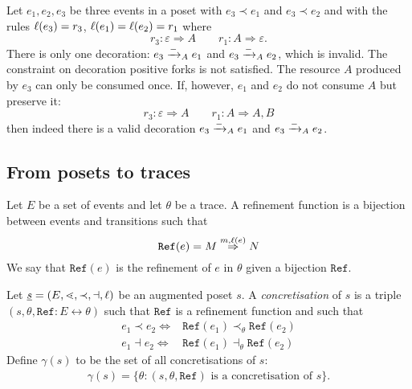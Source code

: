 \begin{example}
  Let $e_1,e_2,e_3$ be three events in a poset with $e_3\prec e_1$ and $e_3\prec e_2$ and with the rules $\ell(e_3)=r_3$, $\ell(e_1)=\ell(e_2)=r_1$ where
  \[
  r_3: \varepsilon \Rightarrow A\qquad r_1: A\Rightarrow \varepsilon.
  \]
  There is only one decoration: $e_3\mathrel{\xrightarrow{-}}_{A} e_1$ and $e_3\mathrel{\xrightarrow{-}}_{A} e_2$, which is invalid. The constraint on decoration positive forks is not satisfied. The resource $A$ produced by $e_3$ can only be consumed once.
  If, however, $e_1$ and $e_2$ do not consume $A$ but preserve it:
  \[
  r_3: \varepsilon \Rightarrow A\qquad r_1: A\Rightarrow A,B
  \]
  then indeed there is a valid decoration $e_3\mathrel{\xrightarrow{-}}_{A} e_1$ and $e_3\mathrel{\xrightarrow{-}}_{A} e_2$.
\end{example}

\subsection{From posets to traces}
\label{sec:refinement}

\begin{definition}
  Let $E$ be a set of events and let $\theta$ be a trace. A refinement function is a bijection between events and transitions such that
  \[
  \mathtt{Ref}(e) = M\overset{m,\ell(e)}{\Rightarrow}N
  \]
  We say that $\mathtt{Ref}(e)$ is the refinement of $e$ in $\theta$ given a bijection $\mathtt{Ref}$.
\end{definition}

\begin{definition}
  \label{def:concret}
  Let $\underline s=(E,\lessdot,\prec,\dashv,\ell)$ be an augmented poset $s$.
  A \emph{concretisation} of $s$ is a triple $(s,\theta,\mathtt{Ref}:E\leftrightarrow\theta)$ such that $\mathtt{Ref}$ is a refinement function and such that
  \begin{align*}
    e_1\prec e_2 \iff& \mathtt{Ref}(e_1) \prec_{\theta}\mathtt{Ref}(e_2)\\
    e_1\dashv e_2 \iff& \mathtt{Ref}(e_1) \dashv_{\theta}\mathtt{Ref}(e_2)
  \end{align*}
  Define $\gamma(s)$ to be the set of all concretisations of $s$:
  \begin{align*}
    \gamma(s) = \{\theta: (s,\theta,\mathtt{Ref})\text{ is a concretisation of }s\}.
  \end{align*}
\end{definition}

